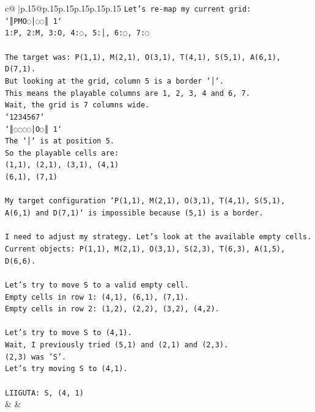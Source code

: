 \documentclass{article}
\begin{document}
{\begin{supertabular}{c@{$\;$}|p{.15\linewidth}@{}p{.15\linewidth}p{.15\linewidth}p{.15\linewidth}p{.15\linewidth}p{.15\linewidth}}
{{{\texttt{Let's re{-}map my current grid:} \\
\texttt{`║PMO◌│◌◌║ 1`} \\
\texttt{1:P, 2:M, 3:O, 4:◌, 5:│, 6:◌, 7:◌} \\
\\ 
\texttt{The target was: P(1,1), M(2,1), O(3,1), T(4,1), S(5,1), A(6,1), D(7,1).} \\
\texttt{But looking at the grid, column 5 is a border `│`.} \\
\texttt{This means the playable columns are 1, 2, 3, 4 and 6, 7.} \\
\texttt{Wait, the grid is 7 columns wide.} \\
\texttt{`1234567`} \\
\texttt{`║◌◌◌◌│O◌║ 1`} \\
\texttt{The `│` is at position 5.} \\
\texttt{So the playable cells are:} \\
\texttt{(1,1), (2,1), (3,1), (4,1)} \\
\texttt{(6,1), (7,1)} \\
\\ 
\texttt{My target configuration `P(1,1), M(2,1), O(3,1), T(4,1), S(5,1), A(6,1) and D(7,1)` is impossible because (5,1) is a border.} \\
\\ 
\texttt{I need to adjust my strategy. Let's look at the available empty cells.} \\
\texttt{Current objects: P(1,1), M(2,1), O(3,1), S(2,3), T(6,3), A(1,5), D(6,6).} \\
\\ 
\texttt{Let's try to move S to a valid empty cell.} \\
\texttt{Empty cells in row 1: (4,1), (6,1), (7,1).} \\
\texttt{Empty cells in row 2: (1,2), (2,2), (3,2), (4,2).} \\
\\ 
\texttt{Let's try to move S to (4,1).} \\
\texttt{Wait, I previously tried (5,1) and (2,1) and (2,3).} \\
\texttt{(2,3) was 'S'.} \\
\texttt{Let's try moving S to (4,1).} \\
\\ 
\texttt{LIIGUTA: S, (4, 1)} \\
            }
        }
    }
    & & \\ \\


\end{supertabular}}
\end{document}
